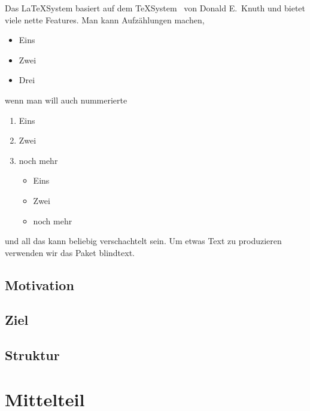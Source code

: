 \documentclass[11pt,a4paper]{article} %
\begin{document}
Das \LaTeX\-System basiert auf dem 
\TeX\-System~\cite{knuth} %
von Donald E.~Knuth %
und bietet viele nette Features.
Man kann Aufzählungen machen,
\begin{itemize}
\item Eins
\item Zwei
\item Drei
\end{itemize}
wenn man will auch nummerierte
\begin{enumerate}
\item Eins
\item Zwei
\item noch mehr
\begin{itemize}
\item Eins
\item Zwei
\item noch mehr
\end{itemize}
\end{enumerate}
und all das kann beliebig verschachtelt sein.
Um etwas Text zu produzieren verwenden wir das Paket
\textsf{blindtext}.

\Blindtext[1] %

\subsection{Motivation}
\Blindtext[2] %

\subsection{Ziel}
\Blindtext[2] %

\subsection{Struktur}
\Blindtext[2] %


\section{Mittelteil} \label{sec:mittelteil}
\end{document}
